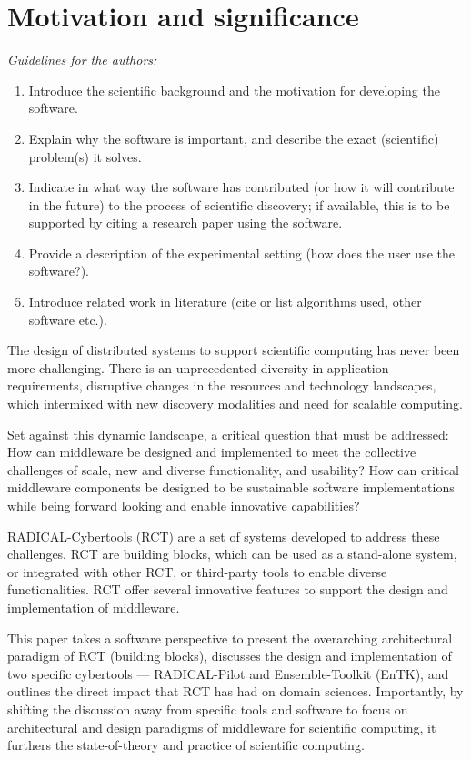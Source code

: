 \documentclass[preprint,12pt, a4paper]{elsarticle}
\begin{document}
\section{Motivation and significance}\label{sec:motivation}

{\em Guidelines for the authors:
\begin{enumerate}
  \item Introduce the scientific background and the motivation for
        developing the software.
  \item Explain why the software is important, and describe the exact
        (scientific) problem(s) it solves.
  \item Indicate in what way the software has contributed (or how it will
        contribute in the future) to the process of scientific discovery;
        if available, this is to be supported by citing a research paper
        using the software.
  \item Provide a description of the experimental setting (how does the 
        user use the software?).
  \item Introduce related work in literature (cite or list algorithms 
          used, other software etc.).
\end{enumerate}}

The design of distributed systems to support scientific computing has never
been more challenging. There is an unprecedented diversity in application
requirements, disruptive changes in the resources and technology landscapes,
which intermixed with new discovery modalities and need for scalable
computing.

Set against this dynamic landscape, a critical question that must be
addressed: How can middleware be designed and implemented to meet the
collective challenges of scale, new and diverse functionality, and usability?
How can critical middleware components be designed to be sustainable software
implementations while being forward looking and enable innovative
capabilities?

RADICAL-Cybertools (RCT) are a set of systems developed to address these
challenges.  RCT are building blocks, which can be used as a stand-alone
system, or integrated with other RCT, or third-party tools to enable diverse
functionalities. RCT offer several innovative features to support the design
and implementation of middleware.

This paper takes a software perspective to present the overarching
architectural paradigm of RCT (building blocks), discusses the design and
implementation of two specific cybertools --- RADICAL-Pilot and
Ensemble-Toolkit (EnTK), and outlines the direct impact that RCT has had on
domain sciences. Importantly, by shifting the discussion away from specific
tools and software to focus on architectural and design paradigms of
middleware for scientific computing,  it furthers the state-of-theory and
practice of scientific computing.
\end{document}
